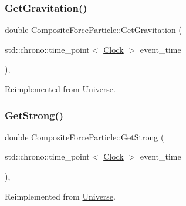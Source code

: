 \mbox{\label{classCompositeForceParticle_a06483dc73c156679f34acf85aa5f924e}} 
\subsubsection{\texorpdfstring{Get\+Gravitation()}{GetGravitation()}}
{\footnotesize\ttfamily double Composite\+Force\+Particle\+::\+Get\+Gravitation (\begin{DoxyParamCaption}\item[{std\+::chrono\+::time\+\_\+point$<$ \mbox{\hyperlink{universe_8h_a0ef8d951d1ca5ab3cfaf7ab4c7a6fd80}{Clock}} $>$}]{event\+\_\+time }\end{DoxyParamCaption})\hspace{0.3cm}{\ttfamily [inline]}, {\ttfamily [virtual]}}



Reimplemented from \mbox{\hyperlink{classUniverse_ab0404e774ee0ed66b597ff5b8e989446}{Universe}}.

\mbox{\label{classCompositeForceParticle_a9818d469c9841eaf77fbe329b0953354}} 
\subsubsection{\texorpdfstring{Get\+Strong()}{GetStrong()}}
{\footnotesize\ttfamily double Composite\+Force\+Particle\+::\+Get\+Strong (\begin{DoxyParamCaption}\item[{std\+::chrono\+::time\+\_\+point$<$ \mbox{\hyperlink{universe_8h_a0ef8d951d1ca5ab3cfaf7ab4c7a6fd80}{Clock}} $>$}]{event\+\_\+time }\end{DoxyParamCaption})\hspace{0.3cm}{\ttfamily [inline]}, {\ttfamily [virtual]}}



Reimplemented from \mbox{\hyperlink{classUniverse_acb453ce71da418c5b5617fecede9571b}{Universe}}.

\mbox{\label{classCompositeForceParticle_abc8597f3b4f7cf755ab4618bd624b046}} 
